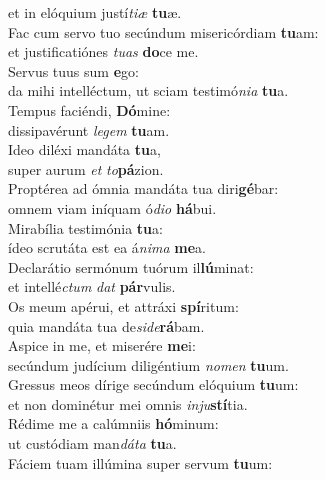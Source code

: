\oddverse et in elóquium justí\textit{ti}\textit{æ} \textbf{tu}æ.\\
\evenverse Fac cum servo tuo secúndum misericórdiam \textbf{tu}am:~\*\\
\evenverse et justificatiónes \textit{tu}\textit{as} \textbf{do}ce me.\\
\oddverse Servus tuus sum \textbf{e}go:~\*\\
\oddverse da mihi intelléctum, ut sciam testimó\textit{ni}\textit{a} \textbf{tu}a.\\
\evenverse Tempus faciéndi, \textbf{Dó}mine:~\*\\
\evenverse dissipavérunt \textit{le}\textit{gem} \textbf{tu}am.\\
\oddverse Ideo diléxi mandáta \textbf{tu}a,~\*\\
\oddverse super aurum \textit{et} \textit{to}\textbf{pá}zion.\\
\evenverse Proptérea ad ómnia mandáta tua diri\textbf{gé}bar:~\*\\
\evenverse omnem viam iníquam ó\textit{di}\textit{o} \textbf{há}bui.\\
\oddverse Mirabília testimónia \textbf{tu}a:~\*\\
\oddverse ídeo scrutáta est ea á\textit{ni}\textit{ma} \textbf{me}a.\\
\evenverse Declarátio sermónum tuórum il\textbf{lú}minat:~\*\\
\evenverse et intellé\textit{ctum} \textit{dat} \textbf{pár}vulis.\\
\oddverse Os meum apérui, et attráxi \textbf{spí}ritum:~\*\\
\oddverse quia mandáta tua de\textit{si}\textit{de}\textbf{rá}bam.\\
\evenverse Aspice in me, et miserére \textbf{me}i:~\*\\
\evenverse secúndum judícium diligéntium \textit{no}\textit{men} \textbf{tu}um.\\
\oddverse Gressus meos dírige secúndum elóquium \textbf{tu}um:~\*\\
\oddverse et non dominétur mei omnis \textit{in}\textit{ju}\textbf{stí}tia.\\
\evenverse Rédime me a calúmniis \textbf{hó}minum:~\*\\
\evenverse ut custódiam man\textit{dá}\textit{ta} \textbf{tu}a.\\
\oddverse Fáciem tuam illúmina super servum \textbf{tu}um:~\*\\
